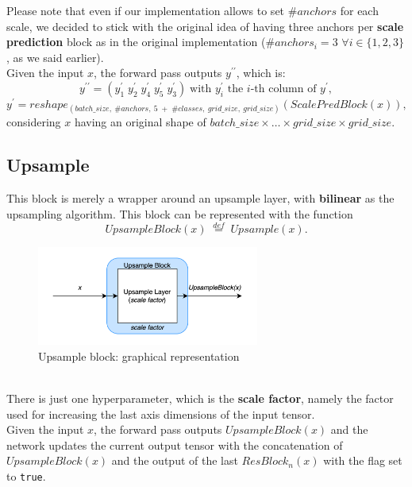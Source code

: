 \documentclass[../report.tex]{subfiles}
\begin{document}
Please note that even if our implementation allows to set $\#anchors$ for each scale, we decided to stick with the original idea of having three anchors per \textbf{scale prediction} block as in the original implementation ($\#anchors_i = 3$ $\forall{} i \in{} {\{1,2,3\}}$, as we said earlier).\\
Given the input $x$, the forward pass outputs $y^{\prime\prime}$, which is:
$$y^{\prime\prime} = (y^\prime_1 \; y^\prime_2 \; y^\prime_4 \; y^\prime_5 \; y^\prime_3) \; \text{with $y^\prime_i$ the $i$-th column of $y^\prime$},$$
$$y^\prime = reshape_{(batch\_size,\ \#anchors,\ 5 \; + \; \#classes,\ grid\_size,\ grid\_size)}(ScalePredBlock(x)),$$
considering $x$ having an original shape of $batch\_size \times{} \dots{} \times{} grid\_size \times{} grid\_size$.

\subsection{Upsample}\label{ss:network-blocks-upsample}
This block is merely a wrapper around an upsample layer, with \textbf{bilinear} as the upsampling algorithm.
This block can be represented with the function
$$UpsampleBlock(x) \; \stackrel{def}{=} \; Upsample(x).$$
\begin{figure}[h]
    \centering
    \includegraphics[width=0.65\textwidth]{assets/images/upsample_block}
    \caption{Upsample block: graphical representation}\label{img:upsample_block}
\end{figure}\\
There is just one hyperparameter, which is the \textbf{scale factor}, namely the factor used for increasing the last axis dimensions of the input tensor.\\
Given the input $x$, the forward pass outputs $UpsampleBlock(x)$ and the network updates the current output tensor with the concatenation of $UpsampleBlock(x)$ and the output of the last $ResBlock_n(x)$ with the flag set to \texttt{true}.
\end{document}
